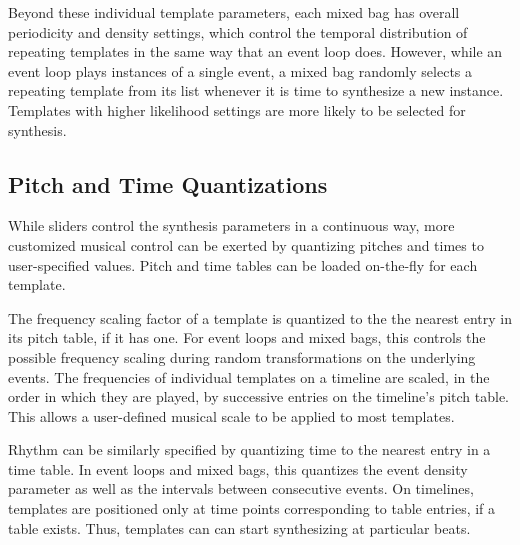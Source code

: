 \documentclass[10pt,letterpaper]{article}
\begin{document}
Beyond these individual template parameters, each mixed bag has overall
periodicity and density settings, which control the temporal
distribution of repeating templates in the same way that an event loop
does. However, while an event loop plays instances of a single event, a
mixed bag randomly selects a repeating template from its list whenever
it is time to synthesize a new instance. Templates with higher
likelihood settings are more likely to be selected for synthesis. 


\subsection{Pitch and Time Quantizations}

While sliders control the synthesis parameters in a continuous way, more
customized musical control can be exerted by quantizing pitches and
times to user-specified values. Pitch and time tables can be loaded
on-the-fly for each template. 

The frequency scaling factor of a template is quantized to the the
nearest entry in its pitch table, if it has one. 
For event loops and mixed bags, this controls the possible
frequency scaling during random transformations on the underlying
events. The frequencies of individual templates on a timeline are
scaled, in the order in which they are played, by successive entries on
the timeline's pitch table. This allows a user-defined musical scale to
be applied to most templates. 

Rhythm can be similarly specified by quantizing time to the nearest
entry in a time table. In event loops and mixed bags, this quantizes the
event density parameter as well as the intervals between consecutive
events. On timelines, templates are positioned only at time points
corresponding to table entries, if a table exists. Thus, templates can
can start synthesizing at particular beats. 
\end{document}
